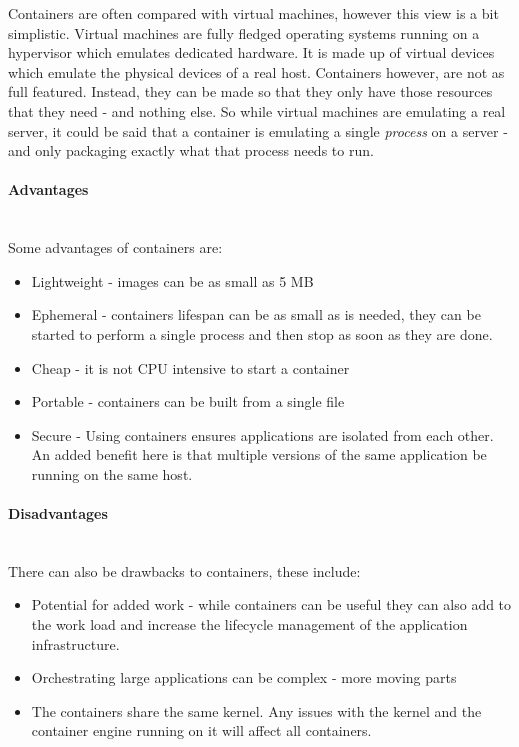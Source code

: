 \documentclass{article}
\begin{document}
Containers are often compared with virtual machines, however this view is a bit simplistic. Virtual machines are fully fledged operating systems running on a hypervisor which emulates dedicated hardware. It is made up of virtual devices which emulate the physical devices of a real host. Containers however, are not as full featured. Instead, they can be made so that they only have those resources that they need - and nothing else. So while virtual machines are emulating a real server, it could be said that a container is emulating a single \textit{process} on a server - and only packaging exactly what that process needs to run.

\paragraph{Advantages}\mbox{}\\
Some advantages of containers are:

\begin{itemize}
  \item Lightweight - images can be as small as 5 MB
  \item Ephemeral - containers lifespan can be as small as is needed, they can be started to perform a single process and then stop as soon as they are done. 
  \item Cheap - it is not CPU intensive to start a container
  \item Portable - containers can be built from a single file
  \item Secure - Using containers ensures applications are isolated from each other. An added benefit here is that multiple versions of the same application be running on the same host.
\end{itemize}

\paragraph{Disadvantages}\mbox{}\\
There can also be drawbacks to containers, these include:

\begin{itemize}
  \item Potential for added work - while containers can be useful they can also add to the work load and increase the lifecycle management of the application infrastructure.
  \item Orchestrating large applications can be complex - more moving parts
  \item The containers share the same kernel. Any issues with the kernel and the container engine running on it will affect all containers.
\end{itemize}
\end{document}
